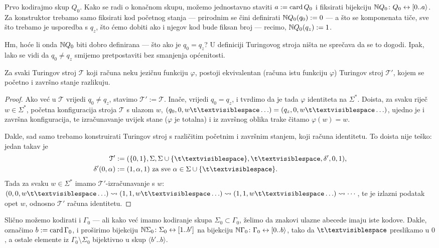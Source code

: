Prvo kodirajmo skup $Q_0$. Kako se radi o konačnom skupu, možemo jednostavno staviti $a:=\operatorname{card} Q_0$ i fiksirati bijekciju ${\mathbb N} Q_0\colon Q_0\leftrightarrow[0..a\rangle$. Za konstruktor trebamo samo fiksirati kod početnog stanja --- prirodnim se čini definirati ${\mathbb N} Q_0(q_0):=0$ --- a što se komponenata tiče, sve što trebamo je usporedba s $q_z$, što ćemo dobiti ako i njegov kod bude fiksan broj --- recimo, ${\mathbb N} Q_0(q_z):=1$.

Hm, hoće li onda ${\mathbb N} Q_0$ biti dobro definirana --- što ako je $q_0=q_z$? U definiciji Turingovog stroja ništa ne sprečava da se to dogodi. Ipak, lako se vidi da $q_0\not=q_z$ smijemo pretpostaviti bez smanjenja općenitosti.

\begin{lema}\label{lm:bsomp-q0neqz}
Za svaki Turingov stroj $\mathcal T$ koji računa neku jezičnu funkciju $\varphi$, postoji ekvivalentan (računa istu funkciju $\varphi$) Turingov stroj $\mathcal T'$, kojem se početno i završno stanje razlikuju.
\end{lema}
\begin{proof}
Ako već u $\mathcal T$ vrijedi $q_0\not=q_z$, stavimo $\mathcal T':=\mathcal T$. Inače, vrijedi $q_0=q_z$, i tvrdimo da je tada $\varphi$ identiteta na $\Sigma^*$. Doista, za svaku riječ $w\in\Sigma^*$, početna konfiguracija stroja $\mathcal T$ s ulazom $w$, $(q_0,0,w\bl\ldots)=(q_z,0,w\bl\ldots)$, ujedno je i završna konfiguracija, te izračunavanje uvijek stane ($\varphi$ je totalna) i iz završnog oblika trake čitamo $\varphi(w)=w$.

Dakle, sad samo trebamo konstruirati Turingov stroj s različitim početnim i za\-vrš\-nim stanjem, koji računa identitetu. To doista nije teško: jedan takav je
\begin{align}
    \mathcal T'&:=(\{0,1\},\Sigma,\Sigma\cup\{\bl\},\bl,\delta',0,1)\text,\\
    \delta'(0,\alpha)&:=(1,\alpha,1)\text{ za sve $\alpha\in\Sigma\cup\{\bl\}$.}
\end{align}
Tada za svaku $w\in\Sigma^*$ imamo $\mathcal T'$-izračunavanje s $w$: $(0,0,w\bl\ldots)\leadsto(1,1,w\bl\ldots)\leadsto(1,1,w\bl\ldots)\leadsto\cdots$,
te je izlazni podatak opet $w$, odnosno $\mathcal T'$ računa identitetu.
\end{proof}

Slično možemo kodirati i $\Gamma_0$ --- ali kako već imamo kodiranje skupa $\Sigma_0\subset\Gamma_0$, želimo da znakovi ulazne abecede imaju iste kodove. Dakle, označimo $b:=\operatorname{card}\Gamma_0$, i proširimo bijekciju ${\mathbb N}\Sigma_0\colon\Sigma_0\leftrightarrow[1..b']$ na bijekciju ${\mathbb N}\Gamma_0\colon\Gamma_0\leftrightarrow[0..b\rangle$, tako da $\bl$ preslikamo u $0$, a ostale elemente iz $\Gamma_0\!\setminus\Sigma_0$ bijektivno u skup $\langle b'\!..b\rangle$.

